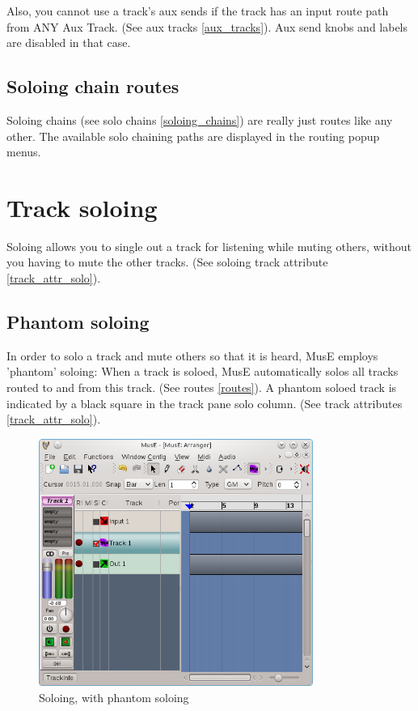 \documentclass[a4paper]{report}
\newcommand{\screenshotwidth}[0]{0.8\textwidth}
\begin{document}
Also, you cannot use a track's aux sends if the track has an input
route path from ANY Aux Track. (See aux tracks \ref{aux_tracks}).
Aux send knobs and labels are disabled in that case.

\subsection{Soloing chain routes} \label{soloing_chain_routes}
Soloing chains (see solo chains \ref{soloing_chains}) are really just
routes like any other. The available solo chaining paths are displayed
in the routing popup menus.

\section{Track soloing} \label{track_soloing}
Soloing allows you to single out a track for listening while muting others,
without you having to mute the other tracks. (See soloing track attribute
\ref{track_attr_solo}).

\subsection{Phantom soloing} \label{phantom_soloing}
In order to solo a track and mute others so that it is heard, MusE
employs 'phantom' soloing: When a track is soloed, MusE automatically
solos all tracks routed to and from this track. (See routes
\ref{routes}). A phantom soloed track is indicated by a black square
in the track pane solo column. (See track attributes
\ref{track_attr_solo}).


\begin{figure}[htp]
\centering \includegraphics[width=\screenshotwidth]{pics/soloing_window}
\caption{Soloing, with phantom soloing}
\label{fig:Soloing} 
\end{figure}
\end{document}
